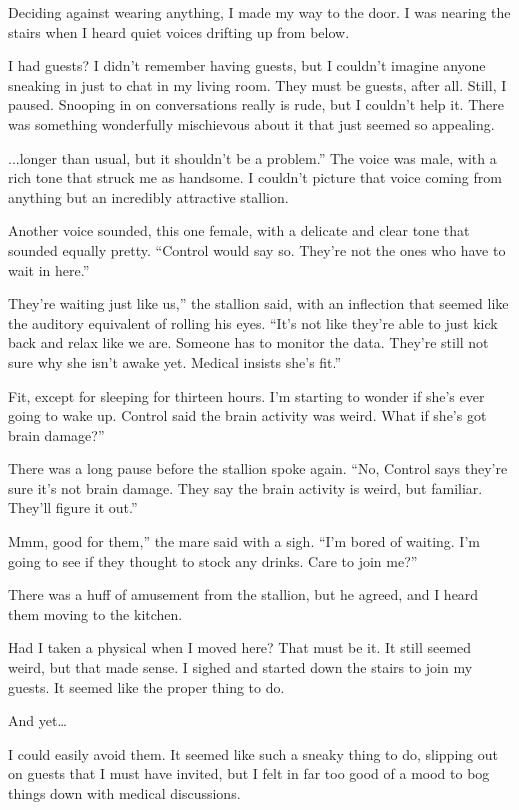 Deciding against wearing anything, I made my way to the door. I was nearing the stairs when I heard quiet voices drifting up from below.

I had guests? I didn’t remember having guests, but I couldn’t imagine anyone sneaking in just to chat in my living room. They must be guests, after all. Still, I paused. Snooping in on conversations really is rude, but I couldn’t help it. There was something wonderfully mischievous about it that just seemed so appealing.

\leavevmode{}...longer than usual, but it shouldn’t be a problem.” The voice was male, with a rich tone that struck me as handsome. I couldn’t picture that voice coming from anything but an incredibly attractive stallion.

Another voice sounded, this one female, with a delicate and clear tone that sounded equally pretty. “Control would say so. They’re not the ones who have to wait in here.”

\leavevmode{}They’re waiting just like us,” the stallion said, with an inflection that seemed like the auditory equivalent of rolling his eyes. “It’s not like they’re able to just kick back and relax like we are. Someone has to monitor the data. They’re still not sure why she isn’t awake yet. Medical insists she’s fit.”

\leavevmode{}Fit, except for sleeping for thirteen hours. I’m starting to wonder if she’s ever going to wake up. Control said the brain activity was weird. What if she’s got brain damage?”

There was a long pause before the stallion spoke again. “No, Control says they’re sure it’s not brain damage. They say the brain activity is weird, but familiar. They’ll figure it out.”

\leavevmode{}Mmm, good for them,” the mare said with a sigh. “I’m bored of waiting. I’m going to see if they thought to stock any drinks. Care to join me?”

There was a huff of amusement from the stallion, but he agreed, and I heard them moving to the kitchen.

Had I taken a physical when I moved here? That must be it. It still seemed weird, but that made sense. I sighed and started down the stairs to join my guests. It seemed like the proper thing to do.

And yet…

I could easily avoid them. It seemed like such a sneaky thing to do, slipping out on guests that I must have invited, but I felt in far too good of a mood to bog things down with medical discussions.

